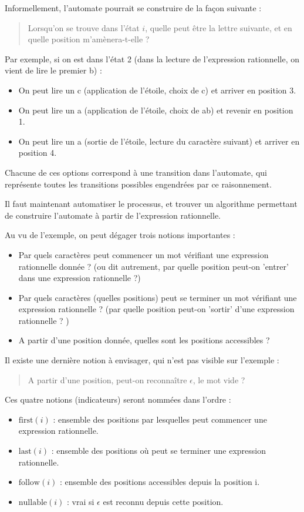 \documentclass{article}
\begin{document}
Informellement, l'automate pourrait se construire de la façon suivante : 

\begin{quote}
Lorsqu'on se trouve dans l'état $i$, quelle peut être la lettre suivante, et en quelle position m'amènera-t-elle ? 
\end{quote}

Par exemple, si on est dans l'état 2 (dans la lecture de l'expression rationnelle, on vient de lire le premier b) : 
\begin{itemize}
\item On peut lire un c (application de l'étoile, choix de c) et arriver en position 3.
\item On peut lire un a (application de l'étoile, choix de ab) et revenir en position 1. 
\item On peut lire un a (sortie de l'étoile, lecture du caractère suivant) et arriver en position 4. 
\end{itemize}
Chacune de ces options correspond à une transition dans l'automate, qui représente toutes les transitions possibles engendrées par ce raisonnement. 

Il faut maintenant automatiser le processus, et trouver un algorithme permettant de construire l'automate à partir
de l'expression rationnelle. 

Au vu de l'exemple, on peut dégager trois notions importantes : 
\begin{itemize}
\item Par quels caractères peut commencer un mot vérifiant une expression rationnelle donnée ? (ou dit autrement, par quelle position peut-on 'entrer' dans une expression rationnelle ?)
\item Par quels caractères (quelles positions) peut se terminer un mot vérifiant une expression rationnelle ? 
(par quelle position peut-on 'sortir' d'une expression rationnelle ? )
\item A partir d'une position donnée, quelles sont les positions accessibles ? 
\end{itemize}

Il existe une dernière notion à envisager, qui n'est pas visible sur l'exemple : 
\begin{quote}
A partir d'une position, peut-on reconnaître $\epsilon$, le mot vide ? 
\end{quote}

Ces quatre notions (indicateurs) seront nommées dans l'ordre : 
\begin{itemize}
\item $\mbox{first}(i)$ : ensemble des positions par lesquelles peut commencer une expression rationnelle. 
\item $\mbox{last}(i)$ : ensemble des positions où peut se terminer une expression rationnelle. 
\item $\mbox{follow}(i)$ : ensemble des positions accessibles depuis la position i.
\item $\mbox{nullable}(i)$ : vrai si $\epsilon$ est reconnu depuis cette position. 
\end{itemize}
\end{document}
